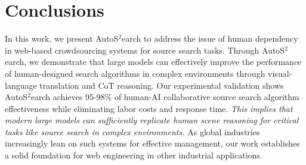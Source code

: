 \section{Conclusions}

In this work, we present AutoS$^2$earch to address the issue of human dependency in web-based crowdsourcing systems for source search tasks. Through AutoS$^2$earch, we demonstrate that large models can effectively improve the performance of human-designed search algorithms in complex environments through visual-language translation and CoT reasoning. Our experimental validation shows AutoS$^2$earch achieves 95-98\% of human-AI collaborative source search algorithm effectiveness while eliminating labor costs and response time. \textit{This implies that modern large models can sufficiently replicate human scene reasoning for critical tasks like source search in complex environments.} As global industries increasingly lean on such systems for effective management, our work establishes a solid foundation for web engineering in other industrial applications.





